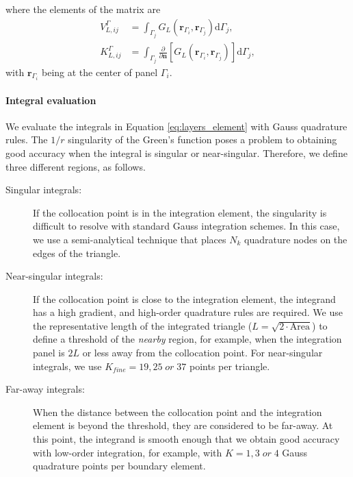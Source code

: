 %
\noindent where the elements of the matrix are
%
\begin{align} \label{eq:layers_element}
V_{L,ij}^{\Gamma} &= \int_{\Gamma_j} G_L(\mathbf{r}_{\Gamma_i},\mathbf{r}_{\Gamma_j})  \mathrm{d} \Gamma_j, \nonumber \\
K_{L,ij}^{\Gamma} &= \int_{\Gamma_j} \frac{\partial}{\partial \mathbf{n}} \left[ G_L(\mathbf{r}_{\Gamma_i},\mathbf{r}_{\Gamma_j}) \right]\mathrm{d} \Gamma_j,
\end{align}
%
\noindent with $\mathbf{r}_{\Gamma_i}$ being at the center of panel $\Gamma_i$.


\paragraph{Integral evaluation}

We evaluate the integrals in Equation \eqref{eq:layers_element} with Gauss quadrature
rules. The $1/r$ singularity of the Green's function poses a
problem to obtaining good accuracy when the integral is 
singular or near-singular. Therefore, we define three different regions, as follows.
\begin{description}
\item[Singular integrals:] If the collocation point is in the integration element,
the singularity is difficult to resolve with standard
Gauss integration schemes. In this case, we use a semi-analytical technique 
\cite{HessSmith1967,ZhuHuangSongWhite2001} that places $N_k$ quadrature nodes on the 
edges of the triangle.

\item[Near-singular integrals:] If the collocation point is close to the integration element,
the integrand has a high gradient, and high-order quadrature rules are required. 
We use the representative length of the integrated triangle ($L = \sqrt{2\cdot\text{Area}}$)
to define a threshold of the \emph{nearby} region, for example, when the integration panel 
is $2L$ or less away from the collocation point. For near-singular integrals, we use 
$K_{fine}=19, 25 \; or \; 37$ points per triangle. 

\item[Far-away integrals:] When the distance between the collocation point and the integration
element is beyond the threshold, they are considered to be far-away. 
At this point, the integrand is smooth enough that we obtain good 
accuracy with low-order integration, for example, with 
$K=1, 3 \; or \; 4$ Gauss quadrature points per boundary element. 
\end{description}

